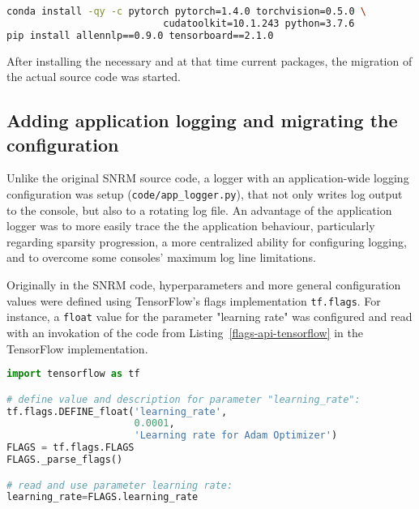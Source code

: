 \begin{lstlisting}[language=bash,frame=single,breaklines=true,float=tbh,caption=Installed Conda and pip packages in Google Colab Notebook for SNRM PyTorch implementation,label=installed-conda-pip-packages-colab-pytorch]
conda install -qy -c pytorch pytorch=1.4.0 torchvision=0.5.0 \
                           cudatoolkit=10.1.243 python=3.7.6
pip install allennlp==0.9.0 tensorboard==2.1.0
\end{lstlisting}

After installing the necessary and at that time current packages, the migration of the actual source code
    was started.

\subsection{Adding application logging and migrating the configuration}

Unlike the original SNRM source code, a logger with an application-wide logging 
    configuration was setup (\texttt{code/app\_logger.py}),
    that not only writes log output to the console, but also to a rotating log file.
An advantage of the application logger was to more easily trace the the application behaviour,
    particularly regarding sparsity progression, a more centralized ability for configuring logging,
    and to overcome some consoles' maximum log line limitations.

Originally in the SNRM code, hyperparameters and more general configuration values were defined using
    TensorFlow's flags implementation \texttt{tf.flags}.
For instance, a \texttt{float} value for the parameter "learning rate" was configured and read with an 
    invokation of the code from Listing~\ref{flags-api-tensorflow} in the TensorFlow implementation.

\begin{lstlisting}[language=Python,frame=single,breaklines=true,float=tbh,caption=Example definition of a parameter “learning\_rate” using TensorFlow's flag api,label=flags-api-tensorflow]
import tensorflow as tf

# define value and description for parameter "learning_rate":
tf.flags.DEFINE_float('learning_rate', 
                      0.0001, 
                      'Learning rate for Adam Optimizer')
FLAGS = tf.flags.FLAGS
FLAGS._parse_flags()

# read and use parameter learning rate:
learning_rate=FLAGS.learning_rate
\end{lstlisting}

